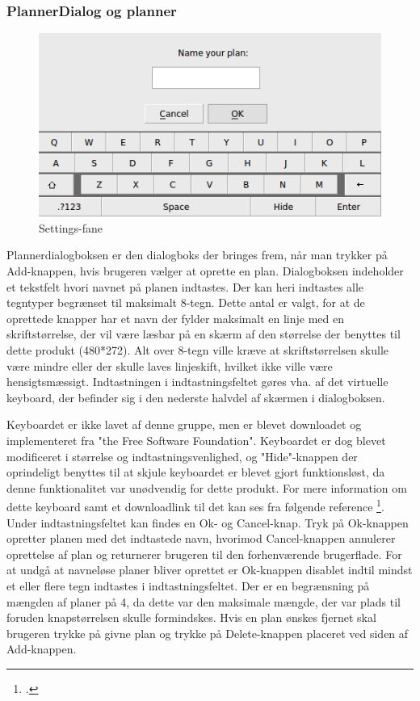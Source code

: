 \subsubsection{PlannerDialog og planner}

\begin{figure}[H]
\centering
\includegraphics[width=0.9\linewidth]{0_Filer/Figuer/plannerDialog.png}
\caption{Settings-fane}
\label{fig:GUI Dialog}
\end{figure}

Plannerdialogboksen er den dialogboks der bringes frem, når man trykker på Add-knappen, hvis brugeren vælger at oprette en plan. Dialogboksen indeholder et tekstfelt hvori navnet på planen indtastes. Der kan heri indtastes alle tegntyper begrænset til maksimalt 8-tegn. Dette antal er valgt, for at de oprettede knapper har et navn der fylder maksimalt en linje med en skriftstørrelse, der vil være læsbar på en skærm af den størrelse der benyttes til dette produkt (480*272). Alt over 8-tegn ville kræve at skriftstørrelsen skulle være mindre eller der skulle laves linjeskift, hvilket ikke ville være hensigtsmæssigt. Indtastningen i indtastningsfeltet gøres vha. af det virtuelle keyboard, der befinder sig i den nederste halvdel af skærmen i dialogboksen. 

Keyboardet er ikke lavet af denne gruppe, men er blevet downloadet og implementeret fra "the Free Software Foundation". Keyboardet er dog blevet modificeret i størrelse og indtastningsvenlighed, og "Hide"-knappen der oprindeligt benyttes til at skjule keyboardet er blevet gjort funktionsløst, da denne funktionalitet var unødvendig for dette produkt. For mere information om dette keyboard samt et downloadlink til det kan ses fra følgende reference \footcite{qtvirtkey}. Under indtastningsfeltet kan findes en Ok- og Cancel-knap. Tryk på Ok-knappen opretter planen med det indtastede navn, hvorimod Cancel-knappen annulerer oprettelse af plan og returnerer brugeren til den forhenværende brugerflade. For at undgå at navneløse planer bliver oprettet er Ok-knappen disablet indtil mindst et eller flere tegn indtastes i indtastningsfeltet. Der er en begrænsning på mængden af planer på 4, da dette var den maksimale mængde, der var plads til foruden knapstørrelsen skulle formindskes. Hvis en plan ønskes fjernet skal brugeren trykke på givne plan og trykke på Delete-knappen placeret ved siden af Add-knappen.

